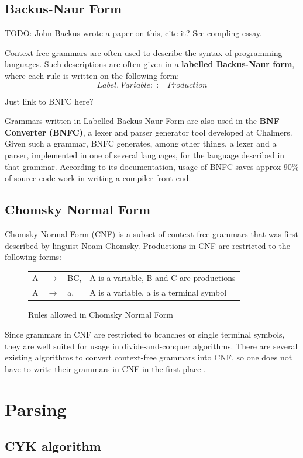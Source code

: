 \documentclass[a4paper,12pt,twosided]{report}
\begin{document}
\subsection{Backus-Naur Form}
TODO: John Backus wrote a paper on this, cite it? See compling-essay.

Context-free grammars are often used to describe the syntax of programming
languages. Such descriptions are often given in a \textbf{labelled Backus-Naur
form}, where each rule is written on the following form:
\[
Label.\ Variable ::= Production 
\]

Just link to BNFC here?

Grammars written in Labelled Backus-Naur Form are also used in the \textbf{BNF
Converter (BNFC)}, a lexer and parser generator tool developed at Chalmers.
Given such a grammar, BNFC generates, among other things, a lexer and a parser,
implemented in one of several languages, for the language described in that
grammar. According to its documentation, usage of BNFC saves approx 90\% of
source code work in writing a compiler front-end. 

\subsection{Chomsky Normal Form}
Chomsky Normal Form (CNF) is a subset of context-free grammars that was first
described by linguist Noam Chomsky. Productions in CNF are restricted to the
following forms:

\begin{figure}[H]
\begin{tabular}{l l l l}
    A & $\rightarrow$ & BC, & A is a variable, B and C are productions \\
    A & $\rightarrow$ & a, & A is a variable, a is a terminal symbol \\
\end{tabular}
\caption{Rules allowed in Chomsky Normal Form}
\end{figure}
Since grammars in CNF are restricted to branches or single terminal symbols,
they are well suited for usage in divide-and-conquer algorithms. There are
several existing algorithms to convert context-free grammars into CNF, so one
does not have to write their grammars in CNF in the first place \cite{langeleiss}.

\section{Parsing}
\subsection{CYK algorithm}
\end{document}

